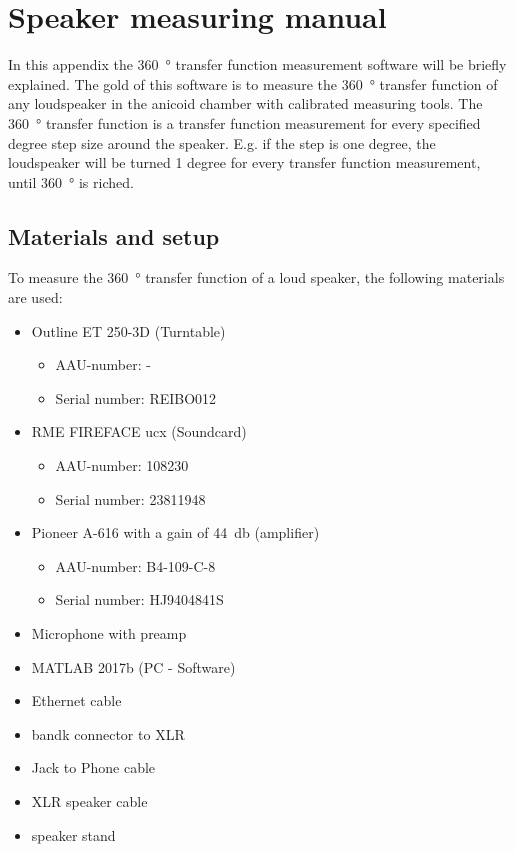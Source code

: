 \chapter*{Speaker measuring manual}
In this appendix the \SI{360}{\degree} transfer function measurement software will be briefly explained. The gold of this software is to measure the \SI{360}{\degree} transfer function of any loudspeaker in the anicoid chamber with calibrated measuring tools. The \SI{360}{\degree} transfer function is a transfer function measurement for every specified degree step size around the speaker. E.g. if the step is one degree, the loudspeaker will be turned 1 degree for every transfer function measurement, until \SI{360}{\degree} is riched.

\section*{Materials and setup}
To measure the \SI{360}{\degree} transfer function of a loud speaker, the following materials are used:
\begin{itemize}
\item Outline ET 250-3D (Turntable)
\begin{itemize}[noitemsep]
\item AAU-number: -
\item Serial number: REIBO012
\end{itemize}
\item RME FIREFACE ucx (Soundcard)
\begin{itemize}[noitemsep]
\item AAU-number: 108230
\item Serial number: 23811948
\end{itemize}
\item Pioneer A-616 with a gain of \SI{44}{\decibel} (amplifier)
\begin{itemize}[noitemsep]
\item AAU-number: B4-109-C-8
\item Serial number: HJ9404841S
\end{itemize}
\item Microphone with preamp
\item MATLAB 2017b (PC - Software)
\item Ethernet cable 
\item \gls{bandk} connector to XLR
\item Jack to Phone cable
\item XLR speaker cable
\item speaker stand
\end{itemize}

